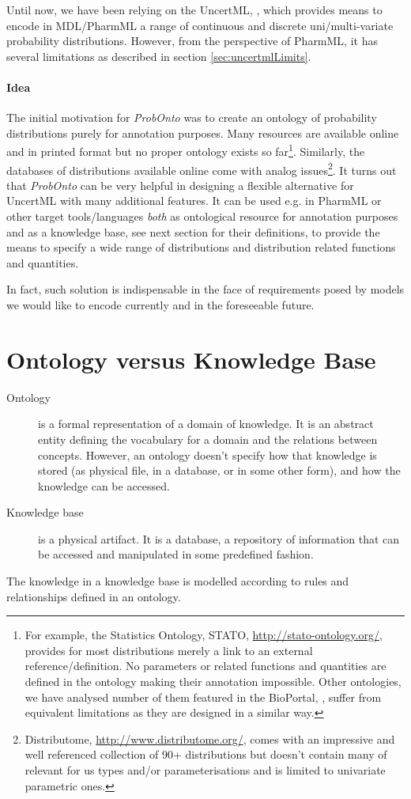 Until now, we have been relying on the UncertML, \cite{uncertml3:2014}, 
which provides means to encode in MDL/PharmML a range of continuous and 
discrete uni/multi-variate probability distributions. However, from the perspective 
of PharmML, it has several limitations as described in section \ref{sec:uncertmlLimits}. 

\paragraph{Idea} The initial motivation for \emph{ProbOnto} was to create an ontology of probability 
distributions purely for annotation purposes. Many resources are available online 
and in printed format but no proper ontology exists so far\footnote{For 
example, the Statistics Ontology, STATO, \url{http://stato-ontology.org/}, provides 
for most distributions merely a link to an external reference/definition. No parameters
or related functions and quantities are defined in the ontology making their annotation
impossible. Other ontologies, we have analysed number of them featured in the 
BioPortal, \cite{noy2009bioportal}, suffer from equivalent limitations
as they are designed in a similar way.}.  
Similarly, the databases of distributions available online come with analog issues\footnote{Distributome, 
\url{http://www.distributome.org/}, comes with an impressive and well referenced collection
of 90+ distributions but doesn't contain many of relevant for us types and/or 
parameterisations and is limited to univariate parametric ones.}.
It turns out that \emph{ProbOnto} can be very helpful in
designing a flexible alternative for UncertML with many additional features.
It can be used e.g. in PharmML or other target tools/languages \emph{both} 
as ontological resource for annotation purposes and as a knowledge base, 
see next section for their definitions, to provide the means to specify a wide range 
of distributions and distribution related functions and quantities.

In fact, such solution is indispensable in the face of requirements 
posed by models we would like to encode currently and in the foreseeable future. 

\section{Ontology versus Knowledge Base}
\begin{description}
\item[Ontology] is a formal representation of a domain of knowledge. It is an abstract entity 
defining the vocabulary for a domain and the relations between concepts.
However, an ontology doesn't specify how that knowledge is stored 
(as physical file, in a database, or in some other form), and how the knowledge 
can be accessed.
\item[Knowledge base] is a physical artifact. It is a database, a repository of information 
that can be accessed and manipulated in some predefined fashion.
\end{description}
The knowledge in a knowledge base is modelled according to rules and relationships 
defined in an ontology.

